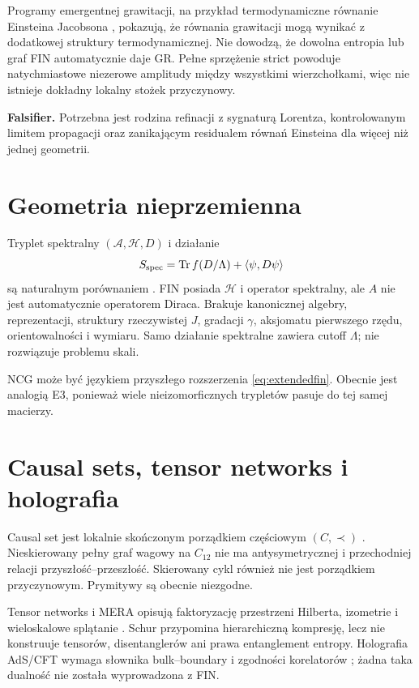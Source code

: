\documentclass[11pt,a4paper]{article}
\begin{document}
Programy emergentnej grawitacji, na przykład termodynamiczne równanie Einsteina Jacobsona \cite{Jacobson}, pokazują, że równania grawitacji mogą wynikać z dodatkowej struktury termodynamicznej. Nie dowodzą, że dowolna entropia lub graf FIN automatycznie daje GR. Pełne sprzężenie strict powoduje natychmiastowe niezerowe amplitudy między wszystkimi wierzchołkami, więc nie istnieje dokładny lokalny stożek przyczynowy.

\textbf{Falsifier.} Potrzebna jest rodzina refinacji z sygnaturą Lorentza, kontrolowanym limitem propagacji oraz zanikającym residualem równań Einsteina dla więcej niż jednej geometrii.

\section{Geometria nieprzemienna}

Tryplet spektralny $(\mathcal A,\mathcal H,D)$ i działanie
\[
S_{\rm spec}=\operatorname{Tr}f(D/\Lambda)+\langle\psi,D\psi\rangle
\]
są naturalnym porównaniem \cite{ChamseddineConnes}. FIN posiada $\mathcal H$ i operator spektralny, ale $A$ nie jest automatycznie operatorem Diraca. Brakuje kanonicznej algebry, reprezentacji, struktury rzeczywistej $J$, gradacji $\gamma$, aksjomatu pierwszego rzędu, orientowalności i wymiaru. Samo działanie spektralne zawiera cutoff $\Lambda$; nie rozwiązuje problemu skali.

NCG może być językiem przyszłego rozszerzenia \eqref{eq:extendedfin}. Obecnie jest analogią E3, ponieważ wiele nieizomorficznych trypletów pasuje do tej samej macierzy.

\section{Causal sets, tensor networks i holografia}

Causal set jest lokalnie skończonym porządkiem częściowym $(C,\prec)$ \cite{Bombelli}. Nieskierowany pełny graf wagowy na $C_{12}$ nie ma antysymetrycznej i przechodniej relacji przyszłość--przeszłość. Skierowany cykl również nie jest porządkiem przyczynowym. Prymitywy są obecnie niezgodne.

Tensor networks i MERA opisują faktoryzację przestrzeni Hilberta, izometrie i wieloskalowe splątanie \cite{Vidal,Swingle}. Schur przypomina hierarchiczną kompresję, lecz nie konstruuje tensorów, disentanglerów ani prawa entanglement entropy. Holografia AdS/CFT wymaga słownika bulk--boundary i zgodności korelatorów \cite{Maldacena}; żadna taka dualność nie została wyprowadzona z FIN.
\end{document}
